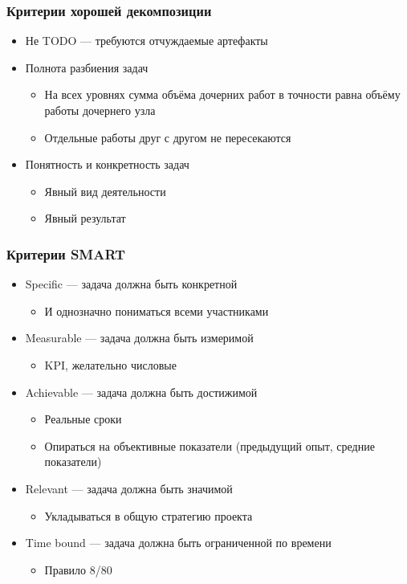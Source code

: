\documentclass{../../slides-style}
\begin{document}
    \begin{frame}
        \frametitle{Критерии хорошей декомпозиции}
        \begin{itemize}
            \item Не TODO --- требуются отчуждаемые артефакты
            \item Полнота разбиения задач
            \begin{itemize}
                \item На всех уровнях сумма объёма дочерних работ в точности равна объёму работы дочернего узла
                \item Отдельные работы друг с другом не пересекаются
            \end{itemize}
            \item Понятность и конкретность задач
            \begin{itemize}
                \item Явный вид деятельности
                \item Явный результат
            \end{itemize} 
        \end{itemize}
    \end{frame}

    \begin{frame}
        \frametitle{Критерии SMART}
        \begin{itemize}
            \item Specific --- задача должна быть конкретной
            \begin{itemize}
                \item И однозначно пониматься всеми участниками
            \end{itemize}
            \item Measurable --- задача должна быть измеримой
            \begin{itemize}
                \item KPI, желательно числовые
            \end{itemize}
            \item Achievable --- задача должна быть достижимой 
            \begin{itemize}
                \item Реальные сроки
                \item Опираться на объективные показатели (предыдущий опыт, средние показатели)
            \end{itemize}
            \item Relevant --- задача должна быть значимой
            \begin{itemize}
                \item Укладываться в общую стратегию проекта
            \end{itemize}
            \item Time bound --- задача должна быть ограниченной по времени
            \begin{itemize}
                \item Правило 8/80
            \end{itemize}
        \end{itemize}
    \end{frame}
\end{document}
